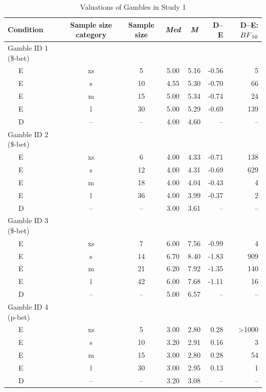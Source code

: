 \documentclass[a4paper, man, floatsintext]{apa6}
\begin{document}
\begin{table}[tbp]

\begin{center}
\begin{threeparttable}

\caption{\label{tab:means_study1}Valuations of Gambles in Study 1}

\begin{tabular}{lccccrr}
\toprule
Condition & Sample size category & Sample size & \textit{Med} & \textit{M} & D--E & D--E:$BF\textsubscript{10}$\\
\midrule
Gamble ID 1 (\$-bet) &  &  &  &  &  & \\
\ \ \ E & xs & 5 & 5.00 & 5.16 & -0.56 & 5\\
\ \ \ E & s & 10 & 4.55 & 5.30 & -0.70 & 66\\
\ \ \ E & m & 15 & 5.00 & 5.34 & -0.74 & 24\\
\ \ \ E & l & 30 & 5.00 & 5.29 & -0.69 & 139\\
\ \ \ D & -- & -- & 4.00 & 4.60 & -- & --\\
Gamble ID 2 (\$-bet) &  &  &  &  &  & \\
\ \ \ E & xs & 6 & 4.00 & 4.33 & -0.71 & 138\\
\ \ \ E & s & 12 & 4.00 & 4.31 & -0.69 & 629\\
\ \ \ E & m & 18 & 4.00 & 4.04 & -0.43 & 4\\
\ \ \ E & l & 36 & 4.00 & 3.99 & -0.37 & 2\\
\ \ \ D & -- & -- & 3.00 & 3.61 & -- & --\\
Gamble ID 3 (\$-bet) &  &  &  &  &  & \\
\ \ \ E & xs & 7 & 6.00 & 7.56 & -0.99 & 4\\
\ \ \ E & s & 14 & 6.70 & 8.40 & -1.83 & 909\\
\ \ \ E & m & 21 & 6.20 & 7.92 & -1.35 & 140\\
\ \ \ E & l & 42 & 6.00 & 7.68 & -1.11 & 16\\
\ \ \ D & -- & -- & 5.00 & 6.57 & -- & --\\
Gamble ID 4 (p-bet) &  &  &  &  &  & \\
\ \ \ E & xs & 5 & 3.00 & 2.80 & 0.28 & >1000\\
\ \ \ E & s & 10 & 3.20 & 2.91 & 0.16 & 3\\
\ \ \ E & m & 15 & 3.00 & 2.80 & 0.28 & 54\\
\ \ \ E & l & 30 & 3.00 & 2.95 & 0.13 & 1\\
\ \ \ D & -- & -- & 3.20 & 3.08 & -- & --\\

\end{tabular}
\end{threeparttable}
\end{center}
\end{table}
\end{document}
